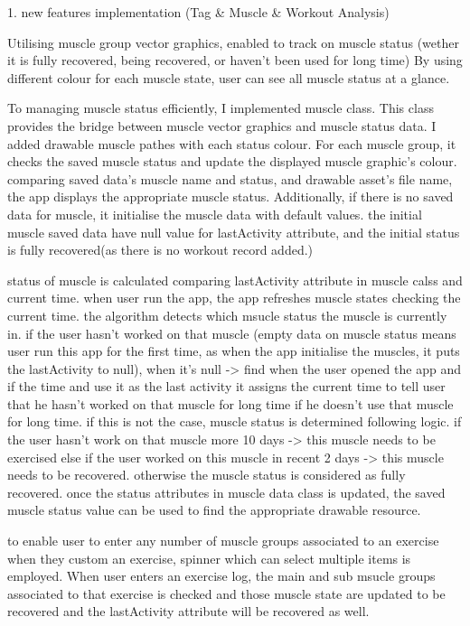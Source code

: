 1. new features implementation (Tag & Muscle & Workout Analysis)


Utilising muscle group vector graphics, enabled to track on muscle status
(wether it is fully recovered, being recovered, or haven't been used for long time)
By using different colour for each muscle state, user can see all muscle status at a glance.

To managing muscle status efficiently, I implemented muscle class.
This class provides the bridge between muscle vector graphics and muscle status data.
I added drawable muscle pathes with each status colour. 
For each muscle group, it checks the saved muscle status and update the displayed muscle graphic's colour.
comparing saved data's muscle name and status, and drawable asset's file name, the app displays the appropriate muscle status.
Additionally, if there is no saved data for muscle, it initialise the muscle data with default values. 
the initial muscle saved data have null value for lastActivity attribute, and the initial status is fully recovered(as there is no workout record added.)

status of muscle is calculated comparing lastActivity attribute in muscle calss and current time.
when user run the app, the app refreshes muscle states checking the current time.
the algorithm detects which msucle status the muscle is currently in.
if the user hasn't worked on that muscle
(empty data on muscle status means user run this app for the first time, 
as when the app initialise the muscles, it puts the lastActivity to null), 
when it's null -> find when the user opened the app and if the time and use it as the last activity 
it assigns the current time to tell user that he hasn't worked on that muscle for long time if he doesn't use that muscle for long time.
if this is not the case, muscle status is determined following logic.
if the user hasn't work on that muscle more 10 days -> this muscle needs to be exercised
else if the user worked on this muscle in recent 2 days -> this muscle needs to be recovered.
otherwise the muscle status is considered as fully recovered.
once the status attributes in muscle data class is updated,
the saved muscle status value can be used to find the appropriate drawable resource.

to enable user to enter any number of muscle groups associated to an exercise when they custom an exercise,
spinner which can select multiple items is employed.
When user enters an exercise log, the main and sub msucle groups associated to that exercise is checked 
and those muscle state are updated to be recovered and the lastActivity attribute will be recovered as well.



